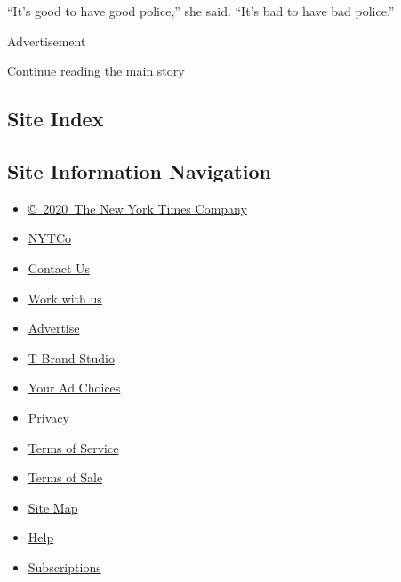 ``It's good to have good police,'' she said. ``It's bad to have bad
police.''

Advertisement

\protect\hyperlink{after-bottom}{Continue reading the main story}

\hypertarget{site-index}{%
\subsection{Site Index}\label{site-index}}

\hypertarget{site-information-navigation}{%
\subsection{Site Information
Navigation}\label{site-information-navigation}}

\begin{itemize}
\tightlist
\item
  \href{https://help.nytimes.com/hc/en-us/articles/115014792127-Copyright-notice}{©~2020~The
  New York Times Company}
\end{itemize}

\begin{itemize}
\tightlist
\item
  \href{https://www.nytco.com/}{NYTCo}
\item
  \href{https://help.nytimes.com/hc/en-us/articles/115015385887-Contact-Us}{Contact
  Us}
\item
  \href{https://www.nytco.com/careers/}{Work with us}
\item
  \href{https://nytmediakit.com/}{Advertise}
\item
  \href{http://www.tbrandstudio.com/}{T Brand Studio}
\item
  \href{https://www.nytimes.com/privacy/cookie-policy\#how-do-i-manage-trackers}{Your
  Ad Choices}
\item
  \href{https://www.nytimes.com/privacy}{Privacy}
\item
  \href{https://help.nytimes.com/hc/en-us/articles/115014893428-Terms-of-service}{Terms
  of Service}
\item
  \href{https://help.nytimes.com/hc/en-us/articles/115014893968-Terms-of-sale}{Terms
  of Sale}
\item
  \href{https://spiderbites.nytimes.com}{Site Map}
\item
  \href{https://help.nytimes.com/hc/en-us}{Help}
\item
  \href{https://www.nytimes.com/subscription?campaignId=37WXW}{Subscriptions}
\end{itemize}
